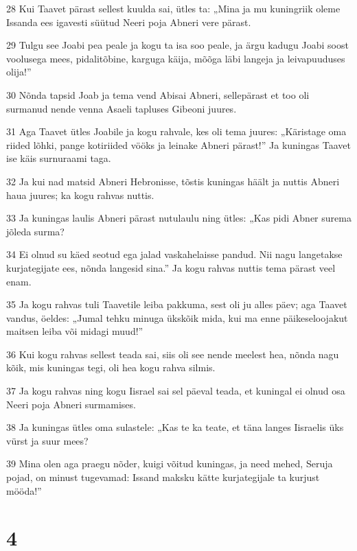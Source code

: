 \par 28 Kui Taavet pärast sellest kuulda sai, ütles ta: „Mina ja mu kuningriik oleme Issanda ees igavesti süütud Neeri poja Abneri vere pärast.
\par 29 Tulgu see Joabi pea peale ja kogu ta isa soo peale, ja ärgu kadugu Joabi soost voolusega mees, pidalitõbine, karguga käija, mõõga läbi langeja ja leivapuuduses olija!”
\par 30 Nõnda tapsid Joab ja tema vend Abisai Abneri, sellepärast et too oli surmanud nende venna Asaeli tapluses Gibeoni juures.
\par 31 Aga Taavet ütles Joabile ja kogu rahvale, kes oli tema juures: „Käristage oma riided lõhki, pange kotiriided vööks ja leinake Abneri pärast!” Ja kuningas Taavet ise käis surnuraami taga.
\par 32 Ja kui nad matsid Abneri Hebronisse, tõstis kuningas häält ja nuttis Abneri haua juures; ka kogu rahvas nuttis.
\par 33 Ja kuningas laulis Abneri pärast nutulaulu ning ütles: „Kas pidi Abner surema jõleda surma?
\par 34 Ei olnud su käed seotud ega jalad vaskahelaisse pandud. Nii nagu langetakse kurjategijate ees, nõnda langesid sina.” Ja kogu rahvas nuttis tema pärast veel enam.
\par 35 Ja kogu rahvas tuli Taavetile leiba pakkuma, sest oli ju alles päev; aga Taavet vandus, öeldes: „Jumal tehku minuga ükskõik mida, kui ma enne päikeseloojakut maitsen leiba või midagi muud!”
\par 36 Kui kogu rahvas sellest teada sai, siis oli see nende meelest hea, nõnda nagu kõik, mis kuningas tegi, oli hea kogu rahva silmis.
\par 37 Ja kogu rahvas ning kogu Iisrael sai sel päeval teada, et kuningal ei olnud osa Neeri poja Abneri surmamises.
\par 38 Ja kuningas ütles oma sulastele: „Kas te ka teate, et täna langes Iisraelis üks vürst ja suur mees?
\par 39 Mina olen aga praegu nõder, kuigi võitud kuningas, ja need mehed, Seruja pojad, on minust tugevamad: Issand maksku kätte kurjategijale ta kurjust mööda!”

\chapter{4}

